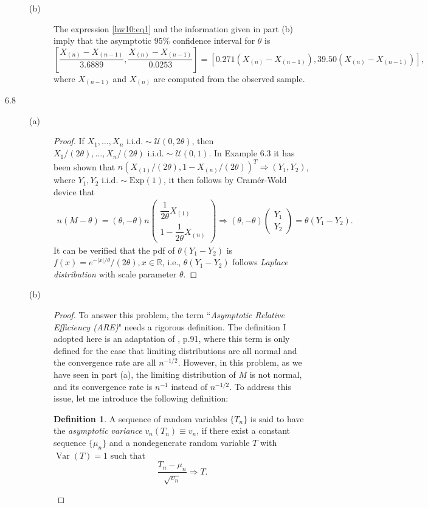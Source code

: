\documentclass{article}
\newcommand{\real}{\mathbb{R}}
\DeclareMathOperator*{\Var}{Var}
\theoremstyle{definition}
\newtheorem*{defn}{Definition}
\theoremstyle{plain}
\theoremstyle{remark}
\begin{document}
\begin{description}
\begin{description}
\item[(b)]
The expression \eqref{hw10:eq1} and the information given in part (b) imply
that the asymptotic $95\%$ confidence interval for $\theta$ is 
\begin{equation*}
    \left[\frac{X_{(n)} - X_{(n - 1)}}{3.6889}, \frac{X_{(n)} - X_{(n - 1)}}{0.0253}\right] = 
    [0.271(X_{(n)} - X_{(n - 1)}), 39.50(X_{(n)} - X_{(n - 1)})],
\end{equation*}
where $X_{(n - 1)}$ and $X_{(n)}$ are computed from the observed sample. 
\end{description}

\item[6.8]
\begin{description}
\item[(a)]
\begin{proof}
If $X_1, \ldots, X_n \text{ i.i.d.} \sim \mathcal{U}(0, 2\theta)$, then $X_1/(2\theta), \ldots, X_n/(2\theta) \text{ i.i.d.} \sim \mathcal{U}(0, 1)$. In Example $6.3$ it has been shown that $n(X_{(1)}/(2\theta), 1 - X_{(n)}/(2\theta))^T 
\Rightarrow (Y_1, Y_2)$, where $Y_1, Y_2 \text{ i.i.d.} \sim \text{Exp}(1)$, it then follows by Cram\'{e}r-Wold device that
\begin{align*}
n(M - \theta) = (\theta, -\theta) n \begin{pmatrix} \dfrac{1}{2\theta}X_{(1)} \\ 1 - \dfrac{1}{2\theta}X_{(n)}\end{pmatrix} \Rightarrow (\theta, -\theta)\begin{pmatrix} Y_1 \\ Y_2 \end{pmatrix} = \theta(Y_1 - Y_2).
\end{align*}
It can be verified that the pdf of $\theta(Y_1 - Y_2)$ is $f(x) = e^{-|x|/\theta}/(2\theta), x \in \real$, i.e., $\theta(Y_1 - Y_2)$ follows \emph{Laplace distribution} with scale parameter $\theta$.
\end{proof}

\item[(b)]
\begin{proof}
To answer this problem, the term ``\emph{Asymptotic Relative Efficiency (ARE)}" needs a rigorous definition. The definition I adopted here is an adaptation of \cite{ferguson1996}, p.91, where this term is only defined for the case that limiting distributions are all normal and the convergence rate are all $n^{-1/2}$.  However, in this problem, as we have seen in part (a), the limiting distribution of $M$ is not
normal, and its convergence rate is $n^{-1}$
instead of $n^{-1/2}$. To address this issue, let me introduce the following definition:
\begin{defn}
A sequence of random variables $\{T_n\}$ is said to have the
\emph{asymptotic variance} $v_n(T_n) \equiv v_n$, if there exist a
constant sequence $\{\mu_n\}$ and a nondegenerate random variable $T$
with $\Var(T) = 1$ such that 
\begin{equation*}
\frac{T_n - \mu_n}{\sqrt{v_n}} \Rightarrow T.
\end{equation*}


\end{defn}
\end{proof}
\end{description}
\end{description}
\end{document}
